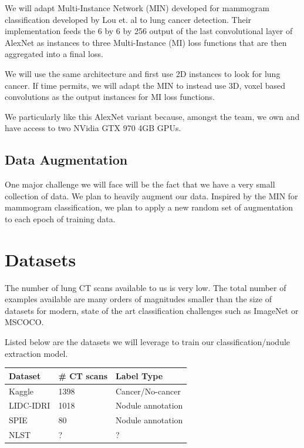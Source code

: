 \documentclass[twocolumn,10pt]{article}
\begin{document}
We will adapt Multi-Instance Network (MIN) developed for mammogram classification developed by
Lou et. al \cite{Maron:1998:FML:302528.302753} to lung cancer detection. 
Their implementation feeds the 6 by 6 by 256 output of the last
convolutional layer of AlexNet as instances to three Multi-Instance (MI) loss functions 
that are then aggregated into a final loss.

We will use the same architecture and first use 2D instances to look for 
lung cancer. If time permits, we will adapt the MIN to instead use 3D, voxel
based convolutions as the output instances for MI loss functions. 

We particularly like this AlexNet variant because, amongst the team, we own and 
have access to two NVidia GTX 970 4GB GPUs.

\subsection{Data Augmentation}

One major challenge we will face will be the fact that we have a very small 
collection of data. We plan to heavily augment our data. Inspired by the MIN
for mammogram classification, we plan to apply a new random set of augmentation
to each epoch of training data.

\section{Datasets}
The number of lung CT scans available to us is very low. The total number of examples
available are many orders of magn{}itudes smaller than the size of datasets for modern,
state of the art classification challenges such as ImageNet or MSCOCO.

Listed below are the datasets we will leverage to train our classification/nodule
extraction model.

\begin{center}
\begin{tabular}{lll}
  \toprule
  Dataset & \# CT scans & Label Type\\
  \midrule
  Kaggle&1398&Cancer/No-cancer\\
  LIDC-IDRI&1018&Nodule annotation\\
  SPIE&80&Nodule annotation\\
  NLST&?&?\\
\end{tabular}
\end{center}
\end{document}
